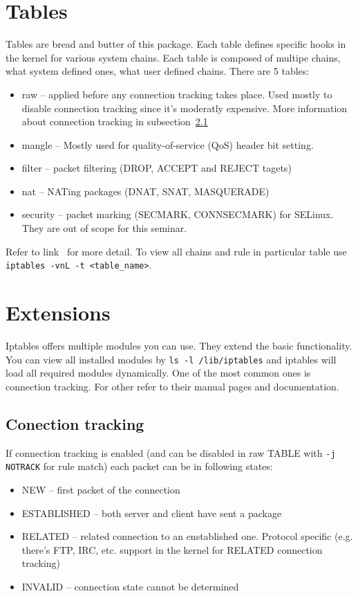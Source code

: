 \documentclass[times, utf8, seminar, english]{fer}
\begin{document}
\section{Tables}
    Tables are bread and butter of this package. Each table defines specific hooks in the kernel for various system chains. Each table is composed of multipe chains, what system defined ones, what user defined chains.
    There are 5 tables:
    \begin{itemize}
        \item raw -- applied before any connection tracking takes place. Used mostly to disable connection tracking since it's moderatly expensive. More information about connection tracking in subsection~\ref{subsec:conn-track}
        \item mangle -- Mostly used for quality-of-service (QoS) header bit setting.
        \item filter -- packet filtering (DROP, ACCEPT and REJECT tagets)
        \item nat -- NATing packages (DNAT, SNAT, MASQUERADE)
        \item security -- packet marking (SECMARK, CONNSECMARK) for SELinux. They are out of scope for this seminar.
    \end{itemize}
    Refer to link~\cite{Iptables27:online} for more detail. To view all chains and rule in particular table use \verb|iptables -vnL -t <table_name>|.

\section{Extensions}
    Iptables offers multiple modules you can use. They extend the basic functionality.
    You can view all installed modules by \texttt{ls -l /lib/iptables} and iptables will load all required modules dynamically. One of the most common ones is connection tracking. For other refer to their manual pages and documentation.

    \subsection{Conection tracking}
    \label{subsec:conn-track}
    If connection tracking is enabled (and can be disabled in raw TABLE with \texttt{-j NOTRACK} for rule match) each packet can be in following states:
    \begin{itemize}
        \item NEW -- first packet of the connection
        \item ESTABLISHED -- both server and client have sent a package
        \item RELATED -- related connection to an enstablished one. Protocol specific (e.g. there's FTP, IRC, etc. support in the kernel for RELATED connection tracking)
        \item INVALID -- connection state cannot be determined
    \end{itemize}
\end{document}
